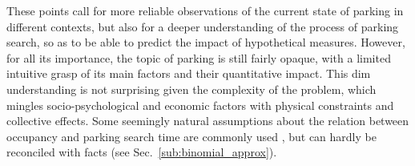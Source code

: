 \documentclass[trsc,reprint]{informs3}
\newcommand{\AN}[1]{#1}
\begin{document}
These points call for more reliable observations of the current state of parking 
in different contexts, but also for a deeper understanding of the process of parking search, so as to be able to predict the impact of hypothetical measures. 
However, for all its importance, the topic of parking is still fairly opaque, with a limited \AN{intuitive} grasp of its main factors and 
their \AN{quantitative} impact. This dim understanding is not surprising given the complexity of the problem, which mingles socio-psychological and economic factors with physical constraints and collective effects. 
Some seemingly natural assumptions about the relation between occupancy
and parking search time \citep{axhausen1994effectiveness,arnott2017cruising} \AN{are commonly used} \citep{geroliminis2015cruising}, but can hardly be reconciled with facts  \AN{(see Sec.~\ref{sub:binomial_approx}).} 

\end{document}
